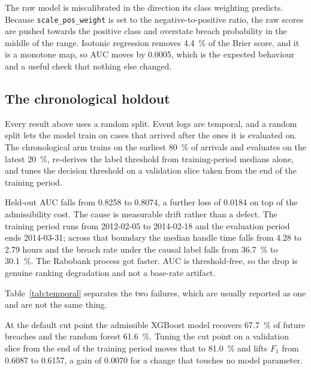 The raw model is miscalibrated in the direction its class weighting predicts. Because
\texttt{scale\_pos\_weight} is set to the negative-to-positive ratio, the raw scores are pushed
towards the positive class and overstate breach probability in the middle of the range.
Isotonic regression removes \SI{4.4}{\percent} of the Brier score, and it is a monotone map, so
AUC moves by \num{0.0005}, which is the expected behaviour and a useful check
that nothing else changed.

\subsection{The chronological holdout}
\label{sec:temporal}

Every result above uses a random split. Event logs are temporal, and a random split lets the
model train on cases that arrived after the ones it is evaluated on. The chronological arm
trains on the earliest \SI{80}{\percent} of arrivals and evaluates on the latest
\SI{20}{\percent}, re-derives the label threshold from training-period medians alone, and tunes
the decision threshold on a validation slice taken from the end of the training period.

Held-out AUC falls from \num{0.8258} to \num{0.8074}, a further loss of \num{0.0184} on top of
the admissibility cost. The cause is measurable drift rather than a defect. The training period
runs from 2012-02-05 to 2014-02-18 and the evaluation period ends 2014-03-31;
across that boundary the median handle time falls from \num{4.28} to \num{2.79} hours and the
breach rate under the causal label falls from \SI{36.7}{\percent} to \SI{30.1}{\percent}. The
Rabobank process got faster. AUC is threshold-free, so the drop is genuine ranking degradation
and not a base-rate artifact.

Table~\ref{tab:temporal} separates the two failures, which are usually reported as one and are
not the same thing.

\begin{table}[htbp]
\centering
\caption{Chronological holdout on \num{9321} future incidents. Each learner appears twice with
identical predicted probabilities and therefore identical AUC; only the decision threshold
differs. The default cut point is a ranking that is fine and an operating point that is wrong.}
\label{tab:temporal}
\small


\end{table}

At the default cut point the admissible XGBoost model recovers \SI{67.7}{\percent} of future breaches and
the random forest \SI{61.6}{\percent}. Tuning the cut point on a validation slice from the end of the
training period moves that to \SI{81.0}{\percent} and lifts $F_1$ from \num{0.6087} to \num{0.6157}, a gain
of \num{0.0070} for a change that touches no model parameter.

